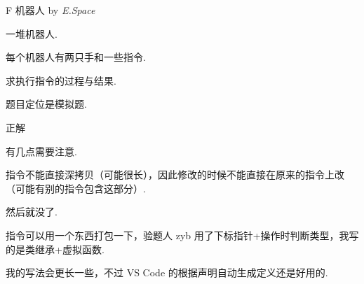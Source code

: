 \begin{frame}{F 机器人 {by \itshape E.Space}}

	一堆机器人.

	每个机器人有两只手和一些指令.

	求执行指令的过程与结果.

	题目定位是模拟题.

\end{frame}

\begin{frame}{正解}

	有几点需要注意. \pause

	指令不能直接深拷贝（可能很长），因此修改的时候不能直接在原来的指令上改（可能有别的指令包含这部分）. \pause

	然后就没了. \pause

	指令可以用一个东西打包一下，验题人 zyb 用了下标指针+操作时判断类型，我写的是类继承+虚拟函数. \pause

	我的写法会更长一些，不过 VS Code 的根据声明自动生成定义还是好用的.

\end{frame}
